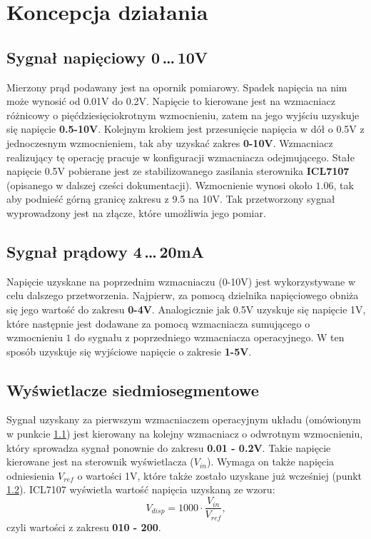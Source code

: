 \documentclass[12pt]{article}
\begin{document}
\section{Koncepcja działania}\label{sec:koncepcja}
\subsection{Sygnał napięciowy 0\,\dots\,10V}\label{subsec:0-10V}
Mierzony prąd podawany jest na opornik pomiarowy. Spadek napięcia na nim może wynosić od 0.01V do 0.2V. Napięcie to kierowane jest na wzmacniacz różnicowy o pięćdziesięciokrotnym wzmocnieniu, zatem na jego wyjściu uzyskuje się napięcie \textbf{0.5-10V}. Kolejnym krokiem jest przesunięcie napięcia w dół o 0.5V z jednoczesnym wzmocnieniem, tak aby uzyskać zakres \textbf{0-10V}. Wzmacniacz realizujący tę operację pracuje w konfiguracji wzmacniacza odejmującego. Stałe napięcie 0.5V pobierane jest ze stabilizowanego zasilania sterownika \textbf{ICL7107} (opisanego w dalszej cześci dokumentacji). Wzmocnienie wynosi około $1.06$, tak aby podnieść górną granicę zakresu z 9.5 na 10V. Tak przetworzony sygnał wyprowadzony jest na złącze, które umożliwia jego pomiar.
\subsection{Sygnał prądowy 4\,\dots\,20mA}\label{subsec:4-20mA}
Napięcie uzyskane na poprzednim wzmacniaczu (0-10V) jest wykorzystywane w celu dalszego przetworzenia. Najpierw, za pomocą dzielnika napięciowego obniża się jego wartość do zakresu \textbf{0-4V}. Analogicznie jak 0.5V uzyskuje się napięcie 1V, które następnie jest dodawane za pomocą wzmacniacza sumującego o wzmocnieniu $1$ do sygnału z poprzedniego wzmacniacza operacyjnego. W ten sposób uzyskuje się wyjściowe napięcie o zakresie \textbf{1-5V}.
\subsection{Wyświetlacze siedmiosegmentowe}\label{subsec:7segmentowe}
Sygnał uzyskany za pierwszym wzmacniaczem operacyjnym układu (omówionym w punkcie \ref{subsec:0-10V}) jest kierowany na kolejny wzmacniacz o odwrotnym wzmocnieniu, który sprowadza sygnał ponownie do zakresu \textbf{0.01 - 0.2V}. Takie napięcie kierowane jest na sterownik wyświetlacza ($V_{in}$). Wymaga on także napięcia odniesienia $V_{ref}$ o wartości 1V, które także zostało uzyskane już wcześniej (punkt \ref{subsec:4-20mA}). ICL7107 wyświetla wartość napięcia uzyskaną ze wzoru:
\begin{equation*}
V_{disp} = 1000 \cdot \frac{V_{in}}{V_{ref}},
\end{equation*}
czyli wartości z zakresu \textbf{010 - 200}. \\
\end{document}

